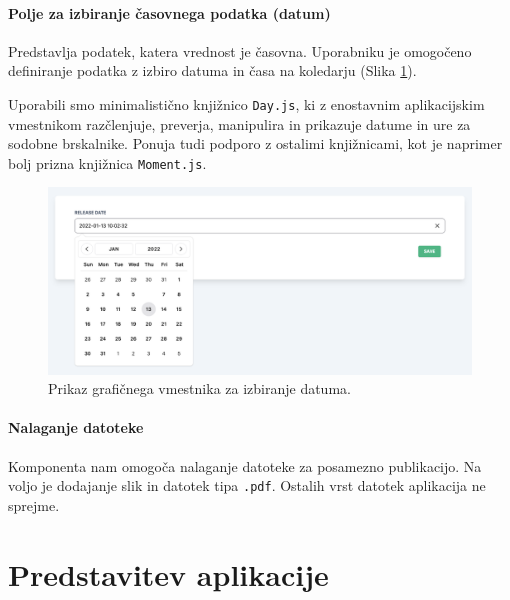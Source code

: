 \documentclass[a4paper, 12pt]{book}
\begin{document}
\subsubsection{Polje za izbiranje časovnega podatka (datum)}
Predstavlja podatek, katera vrednost je časovna. Uporabniku je omogočeno definiranje podatka z izbiro datuma in časa na koledarju (Slika \ref{type-date}). 

Uporabili smo minimalistično knjižnico \verb=Day.js=, ki z enostavnim aplikacijskim vmestnikom razčlenjuje, preverja, manipulira in prikazuje datume in ure za sodobne brskalnike. Ponuja tudi podporo z ostalimi knjižnicami, kot je naprimer bolj prizna knjižnica \verb=Moment.js=.


\begin{figure}[h]
\begin{center}
\includegraphics[width=1\textwidth]{slike/type_date.png}
\end{center}
\caption{ Prikaz grafičnega vmestnika za izbiranje datuma. }
\label{type-date}
\end{figure}

\subsubsection{Nalaganje datoteke}
Komponenta nam omogoča nalaganje datoteke za posamezno publikacijo. Na voljo je dodajanje slik in datotek tipa \verb=.pdf=. Ostalih vrst datotek aplikacija ne sprejme.

\chapter{Predstavitev aplikacije}
\end{document}
